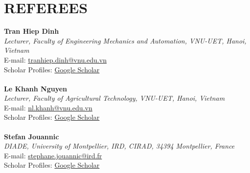 \documentclass[a4paper,9pt]{extarticle}
\begin{document}
\section*{REFEREES}
\label{sec:referees}
\textbf{Tran Hiep Dinh}\\
\textit{Lecturer, Faculty of Engineering Mechanics and Automation, VNU-UET, Hanoi, Vietnam}\\
E-mail: \href{mailto:tranhiep.dinh@vnu.edu.vn}{tranhiep.dinh@vnu.edu.vn}\\
Scholar Profiles: \href{https://scholar.google.com/citations?user=fJYX_zsAAAAJ&hl=en&oi=ao}{Google Scholar} \\ \\
\textbf{Le Khanh Nguyen}\\
\textit{Lecturer, Faculty of Agricultural Technology, VNU-UET, Hanoi, Vietnam}\\
E-mail: \href{mailto:nl.khanh@vnu.edu.vn}{nl.khanh@vnu.edu.vn}\\
Scholar Profiles: \href{https://scholar.google.com/citations?user=E-1iGYIAAAAJ&hl=en&oi=ao}{Google Scholar} \\ \\
\textbf{Stefan Jouannic}\\
\textit{DIADE, University of Montpellier, IRD, CIRAD, 34394 Montpellier, France}\\
E-mail: \href{mailto:stephane.jouannic@ird.fr}{stephane.jouannic@ird.fr}\\
Scholar Profiles: \href{https://scholar.google.com/citations?user=y5kP-ZAAAAAJ&hl=vi}{Google Scholar} \\ \\

\end{document}
